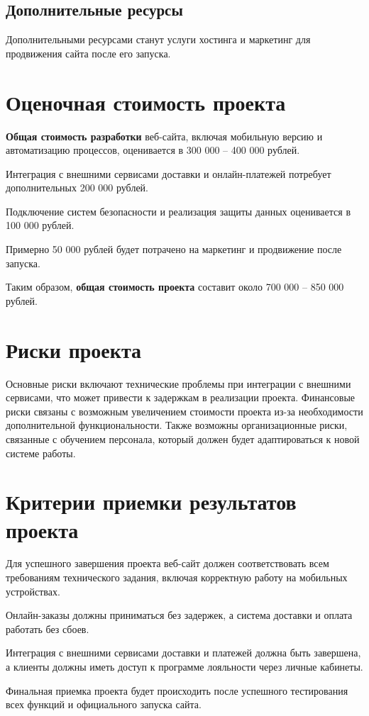 \subsection{Дополнительные ресурсы}

Дополнительными ресурсами станут услуги хостинга
и маркетинг для продвижения сайта после его запуска.

\section{Оценочная стоимость проекта}

\textbf{Общая стоимость разработки} веб-сайта,
включая мобильную версию и автоматизацию процессов,
оценивается в 300 000 -- 400 000 рублей.\par
Интеграция с внешними сервисами доставки
и онлайн-платежей потребует дополнительных 200 000 рублей.\par
Подключение систем безопасности
и реализация защиты данных оценивается в 100 000 рублей.\par
Примерно 50 000 рублей будет потрачено на маркетинг
и продвижение после запуска.\par
Таким образом, \textbf{общая стоимость проекта}
составит около 700 000 -- 850 000 рублей.

\section{Риски проекта}

Основные риски включают технические проблемы
при интеграции с внешними сервисами,
что может привести к задержкам в реализации проекта.
Финансовые риски связаны с возможным увеличением стоимости проекта
из-за необходимости дополнительной функциональности.
Также возможны организационные риски,
связанные с обучением персонала,
который должен будет адаптироваться к новой системе работы.

\section{Критерии приемки результатов проекта}

Для успешного завершения проекта веб-сайт
должен соответствовать всем требованиям технического задания,
включая корректную работу на мобильных устройствах.\par
Онлайн-заказы должны приниматься без задержек,
а система доставки и оплата работать без сбоев.\par
Интеграция с внешними сервисами доставки и платежей должна быть завершена,
а клиенты должны иметь доступ к программе лояльности через личные кабинеты.\par
Финальная приемка проекта будет происходить после успешного тестирования
всех функций и официального запуска сайта.

